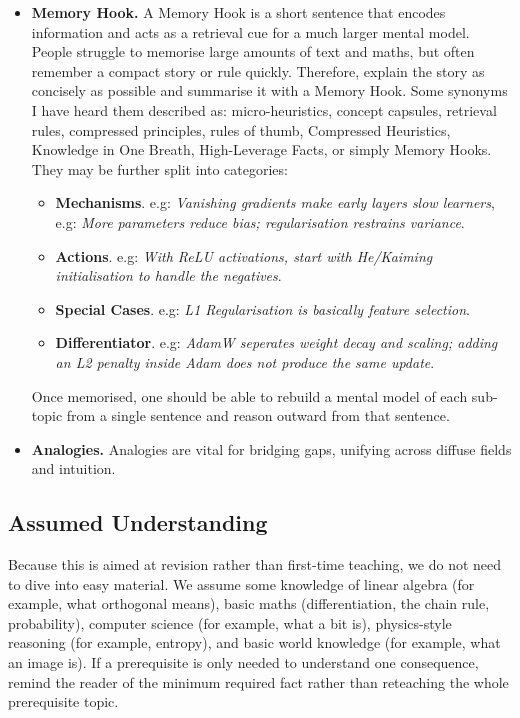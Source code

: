 \begin{itemize}
    \item \textbf{Memory Hook.}
    A Memory Hook is a short sentence that encodes information and acts as a retrieval cue for a much larger mental model.
    People struggle to memorise large amounts of text and maths, but often remember a compact story or rule quickly.
    Therefore, explain the story as concisely as possible and summarise it with a Memory Hook.
    Some synonyms I have heard them described as: micro-heuristics, concept capsules, retrieval rules, compressed principles, rules of thumb, Compressed Heuristics, Knowledge in One Breath, High-Leverage Facts, or simply Memory Hooks. 
    They may be further split into categories:
    \begin{itemize}
        \item \textbf{Mechanisms}. e.g: \textit{Vanishing gradients make early layers slow learners}, e.g: \textit{More parameters reduce bias; regularisation restrains variance}.
        \item \textbf{Actions}. e.g: \textit{With ReLU activations, start with He/Kaiming initialisation to handle the negatives}.
        \item \textbf{Special Cases}. e.g: \textit{L1 Regularisation is basically feature selection}.
        \item \textbf{Differentiator}. e.g: \textit{AdamW seperates weight decay and scaling; adding an L2 penalty inside Adam does not produce the same update}.
    \end{itemize}
    Once memorised, one should be able to rebuild a mental model of each sub-topic from a single sentence and reason outward from that sentence.
    \item \textbf{Analogies.} Analogies are vital for bridging gaps, unifying across diffuse fields and intuition.
\end{itemize}



\subsection*{Assumed Understanding}

Because this is aimed at revision rather than first-time teaching, we do not need to dive into easy material.
We assume some knowledge of linear algebra (for example, what orthogonal means), basic maths (differentiation, the chain rule, probability), computer science (for example, what a bit is), physics-style reasoning (for example, entropy), and basic world knowledge (for example, what an image is).
If a prerequisite is only needed to understand one consequence, remind the reader of the minimum required fact rather than reteaching the whole prerequisite topic.

